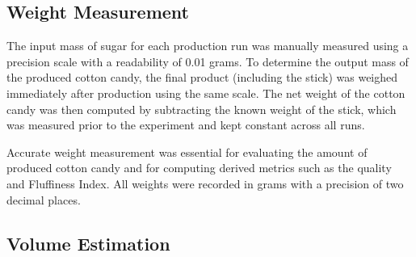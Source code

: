\subsection{Weight Measurement}


The input mass of sugar for each production run was manually measured using a precision scale with a readability of 0.01 grams. To determine the output mass of the produced cotton candy, the final product (including the stick) was weighed immediately after production using the same scale. The net weight of the cotton candy was then computed by subtracting the known weight of the stick, which was measured prior to the experiment and kept constant across all runs.

Accurate weight measurement was essential for evaluating the amount of produced cotton candy and for computing derived metrics such as the quality and Fluffiness Index. All weights were recorded in grams with a precision of two decimal places.




\subsection{Volume Estimation}

